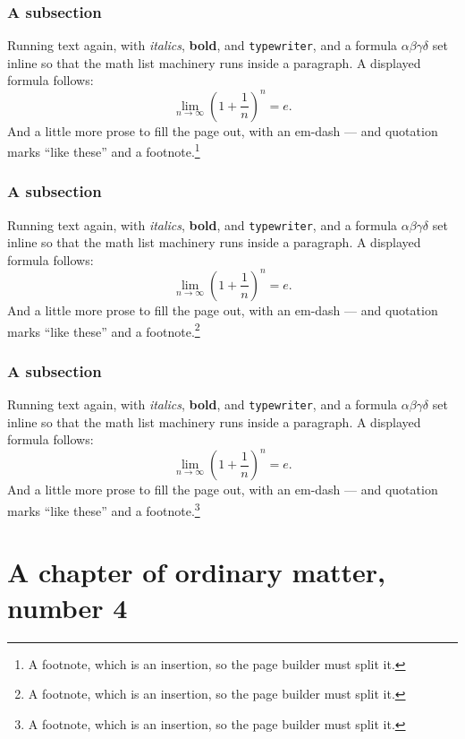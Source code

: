 \documentclass[11pt,a4paper]{report}
\theoremstyle{plain}
\begin{document}
\subsection{A subsection}
Running text again, with \textit{italics}, \textbf{bold}, and
\texttt{typewriter}, and a formula $\alpha\beta\gamma\delta$ set inline so
that the math list machinery runs inside a paragraph. A displayed formula
follows:
\[ \lim_{n\to\infty}\left(1+\frac{1}{n}\right)^{n}=e . \]
And a little more prose to fill the page out, with an em-dash --- and
quotation marks ``like these'' and a footnote.\footnote{A footnote, which is
an insertion, so the page builder must split it.}
\subsection{A subsection}
Running text again, with \textit{italics}, \textbf{bold}, and
\texttt{typewriter}, and a formula $\alpha\beta\gamma\delta$ set inline so
that the math list machinery runs inside a paragraph. A displayed formula
follows:
\[ \lim_{n\to\infty}\left(1+\frac{1}{n}\right)^{n}=e . \]
And a little more prose to fill the page out, with an em-dash --- and
quotation marks ``like these'' and a footnote.\footnote{A footnote, which is
an insertion, so the page builder must split it.}
\subsection{A subsection}
Running text again, with \textit{italics}, \textbf{bold}, and
\texttt{typewriter}, and a formula $\alpha\beta\gamma\delta$ set inline so
that the math list machinery runs inside a paragraph. A displayed formula
follows:
\[ \lim_{n\to\infty}\left(1+\frac{1}{n}\right)^{n}=e . \]
And a little more prose to fill the page out, with an em-dash --- and
quotation marks ``like these'' and a footnote.\footnote{A footnote, which is
an insertion, so the page builder must split it.}
\chapter{A chapter of ordinary matter, number 4}
\end{document}

